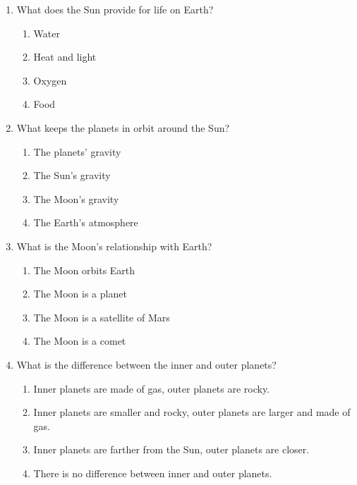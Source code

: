 \documentclass[12pt]{article}
\begin{document}
\begin{enumerate}
    \item What does the Sun provide for life on Earth?
    \begin{enumerate}[label=\Alph*.]
        \item Water
        \item Heat and light
        \item Oxygen
        \item Food
    \end{enumerate}
    \vspace{0.5cm}

    \item What keeps the planets in orbit around the Sun?
    \begin{enumerate}[label=\Alph*.]
        \item The planets' gravity
        \item The Sun's gravity
        \item The Moon's gravity
        \item The Earth's atmosphere
    \end{enumerate}
    \vspace{6.5cm}

    \item What is the Moon's relationship with Earth?
    \begin{enumerate}[label=\Alph*.]
        \item The Moon orbits Earth
        \item The Moon is a planet
        \item The Moon is a satellite of Mars
        \item The Moon is a comet
    \end{enumerate}
    \vspace{0.5cm}

    \item What is the difference between the inner and outer planets?
    \begin{enumerate}[label=\Alph*.]
        \item Inner planets are made of gas, outer planets are rocky.
        \item Inner planets are smaller and rocky, outer planets are larger and made of gas.
        \item Inner planets are farther from the Sun, outer planets are closer.
        \item There is no difference between inner and outer planets.
    \end{enumerate}
    \vspace{0.5cm}


\end{enumerate}
\end{document}
